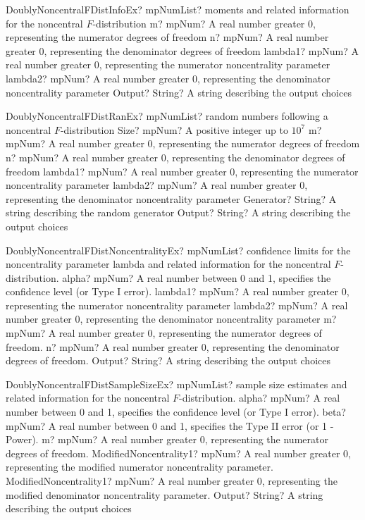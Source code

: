 \documentclass[12pt,a4paper,openany]{book}
\begin{document}
\begin{mpFunctionsExtract}
\mpFunctionFiveNotImplemented
{DoublyNoncentralFDistInfoEx? mpNumList? moments and related information for the noncentral $F$-distribution}
{m? mpNum? A real number greater 0, representing the numerator  degrees of freedom}
{n? mpNum? A real number greater 0, representing the denominator degrees of freedom}
{lambda1? mpNum? A real number greater 0, representing the numerator noncentrality parameter}
{lambda2? mpNum? A real number greater 0, representing the denominator noncentrality parameter}
{Output? String? A string describing the output choices}
\end{mpFunctionsExtract}

\begin{mpFunctionsExtract}
\mpFunctionSixNotImplemented
{DoublyNoncentralFDistRanEx? mpNumList? random numbers following a noncentral $F$-distribution}
{Size? mpNum? A positive integer up to $10^7$}
{m? mpNum? A real number greater 0, representing the numerator  degrees of freedom}
{n? mpNum? A real number greater 0, representing the denominator degrees of freedom}
{lambda1? mpNum? A real number greater 0, representing the numerator noncentrality parameter}
{lambda2? mpNum? A real number greater 0, representing the denominator noncentrality parameter}
{Generator? String? A string describing the random generator}
{Output? String? A string describing the output choices}
\end{mpFunctionsExtract}

\begin{mpFunctionsExtract}
\mpFunctionSixNotImplemented
{DoublyNoncentralFDistNoncentralityEx? mpNumList? confidence limits for the noncentrality parameter lambda and related information for the noncentral $F$-distribution.}
{alpha? mpNum? A real number between 0 and 1, specifies the confidence level (or Type I error).}
{lambda1? mpNum? A real number greater 0, representing the numerator noncentrality parameter}
{lambda2? mpNum? A real number greater 0, representing the denominator noncentrality parameter}
{m? mpNum? A real number greater 0, representing the numerator  degrees of freedom.}
{n? mpNum? A real number greater 0, representing the denominator degrees of freedom.}
{Output? String? A string describing the output choices}
\end{mpFunctionsExtract}

\begin{mpFunctionsExtract}
\mpFunctionSixNotImplemented
{DoublyNoncentralFDistSampleSizeEx? mpNumList? sample size estimates and related information for the noncentral $F$-distribution.}
{alpha? mpNum? A real number between 0 and 1, specifies the confidence level (or Type I error).}
{beta? mpNum?  A real number between 0 and 1, specifies the Type II error (or 1 - Power).}
{m? mpNum? A real number greater 0, representing the numerator  degrees of freedom.}
{ModifiedNoncentrality1? mpNum? A real number greater 0, representing the modified numerator noncentrality parameter.}
{ModifiedNoncentrality1? mpNum? A real number greater 0, representing the modified denominator noncentrality parameter.}
{Output? String? A string describing the output choices}
\end{mpFunctionsExtract}
\end{document}

